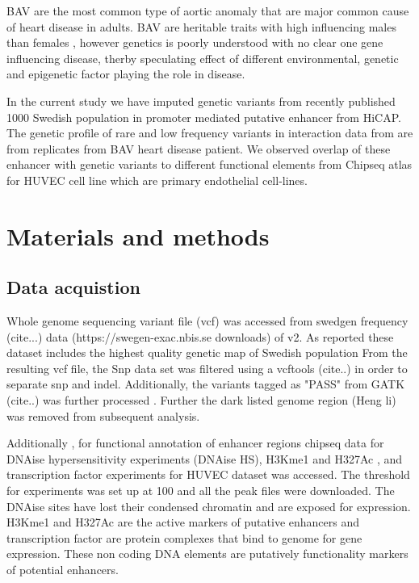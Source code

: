 \documentclass[11pt]{article} %
\begin{document}
BAV are the most common type of aortic anomaly that are major common cause of heart disease in adults. BAV are heritable traits with high influencing males than females , however genetics is poorly understood with no clear one gene influencing disease, therby speculating effect of different environmental, genetic and epigenetic factor playing the role in disease.

In the current study we have imputed genetic variants from recently published 1000 Swedish population in promoter mediated putative enhancer from HiCAP. The genetic profile of rare and low frequency variants in interaction data from  are from replicates from BAV heart disease patient. We observed overlap of these enhancer with genetic variants to different functional elements from Chipseq atlas for HUVEC cell line which are primary endothelial cell-lines. 



\section{Materials and methods}

\subsection{Data acquistion}
Whole genome sequencing variant file (vcf) was accessed from swedgen frequency (cite...) data (https://swegen-exac.nbis.se downloads) of v2. As reported these dataset includes the highest quality genetic map of Swedish population
From the resulting vcf file, the Snp data set was filtered using a vcftools (cite..) in order to separate  snp and indel. Additionally, the variants tagged as "PASS" from GATK (cite..) was further processed . Further the dark listed genome region (Heng li) was removed from subsequent analysis.

Additionally , for functional annotation of enhancer regions chipseq data for DNAise hypersensitivity experiments (DNAise HS), H3Kme1  and H327Ac , and transcription factor experiments for HUVEC dataset was accessed.  The threshold for experiments was set up at 100 and all the peak files were downloaded.  The DNAise sites have lost their condensed chromatin and are exposed for expression. H3Kme1 and H327Ac are the active markers of  putative enhancers and transcription factor are protein complexes that bind to genome for gene expression. These non coding DNA elements  are putatively functionality markers of potential enhancers. 
\end{document}
